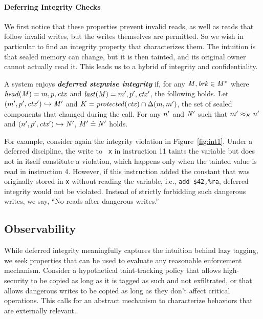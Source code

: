 \documentclass[acmsmall,review,anonymous]{acmart}\settopmatter{printfolios=true,printccs=false,printacmref=false}
\begin{document}
{\paragraph*{Deferring Integrity Checks}

We first notice that these properties prevent invalid reads, as well as reads
that follow invalid writes, but the writes themselves are permitted.
So we wish in particular to find an integrity property that characterizes them.
The intuition is that sealed memory can change, but it is
then tainted, and its original owner cannot actually read it. This
leads us to a hybrid of integrity and confidentiality.

A system enjoys \textbf{\textit{deferred stepwise integrity}} if,
for any \(\mathit{M},\mathit{brk} \in \mathit{M}^*\) where \(\mathit{head}(\mathit{M}) = m,p,\mathit{ctx}\) and
\(\mathit{last}(\mathit{M}) = m',p',\mathit{ctx}'\), the following holds. Let
\((m',p',\mathit{ctx}') \hookrightarrow \mathit{M}'\) and
\(K = \mathit{protected}(\mathit{ctx}) \cap \Delta(m,m')\), the
set of sealed components that changed during the call.
For any \(n'\) and \(\mathit{N}'\) such that \(m' \approx_{K} n'\) and 
\((n',p',\mathit{ctx}') \hookrightarrow \mathit{N}'\), \(\mathit{M}' \doteq \mathit{N}'\) holds.

For example, consider again the integrity violation in
Figure~\ref{fig:int1}. Under a deferred discipline, the write to {\tt
  x} in instruction 11 taints the variable but does not in itself
constitute a violation, which happens only when the tainted value is
read in instruction 4. However, if this instruction added the constant
that was originally stored in {\tt x} without reading the variable,
i.e., {\tt add \$42,\%ra}, deferred integrity would not be violated.
Instead of strictly forbidding such dangerous writes, we say,
``No reads after dangerous writes.''

\subsection{Observability}


While deferred integrity meaningfully captures the intuition
behind lazy tagging, we seek properties that can be used to evaluate any reasonable
enforcement mechanism. Consider a hypothetical
taint-tracking policy that allows high-security to be copied as long as it is
tagged as such and not exfiltrated, or that allows dangerous writes to be
copied as long as they don't affect critical operations. This calls for
an abstract mechanism to characterize behaviors that are externally relevant.

}
\end{document}
